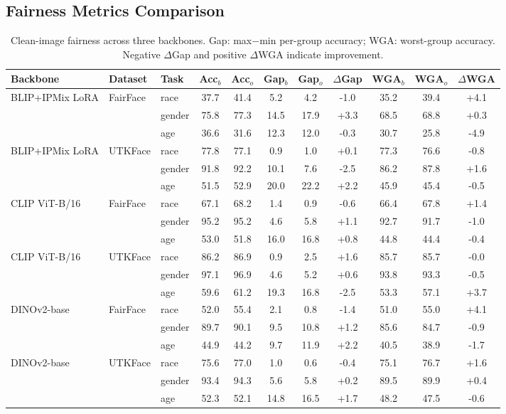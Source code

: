 \subsection{Fairness Metrics Comparison}
\label{app:fairness}

\begin{table}[tbp]
\caption{Clean-image fairness across three backbones. Gap: max$-$min per-group accuracy; WGA: worst-group accuracy. Negative $\Delta$Gap and positive $\Delta$WGA indicate improvement.}
\label{tab:app_fairness}
\centering\small
\begin{tabular}{ll l cc cc c cc c}
\toprule
Backbone & Dataset & Task & Acc$_b$ & Acc$_o$ & Gap$_b$ & Gap$_o$ & $\Delta$Gap & WGA$_b$ & WGA$_o$ & $\Delta$WGA \\
\midrule
BLIP+IPMix LoRA & FairFace & race & 37.7 & 41.4 & 5.2 & 4.2 & -1.0 & 35.2 & 39.4 & +4.1 \\
 &  & gender & 75.8 & 77.3 & 14.5 & 17.9 & +3.3 & 68.5 & 68.8 & +0.3 \\
 &  & age & 36.6 & 31.6 & 12.3 & 12.0 & -0.3 & 30.7 & 25.8 & -4.9 \\
\midrule
BLIP+IPMix LoRA & UTKFace & race & 77.8 & 77.1 & 0.9 & 1.0 & +0.1 & 77.3 & 76.6 & -0.8 \\
 &  & gender & 91.8 & 92.2 & 10.1 & 7.6 & -2.5 & 86.2 & 87.8 & +1.6 \\
 &  & age & 51.5 & 52.9 & 20.0 & 22.2 & +2.2 & 45.9 & 45.4 & -0.5 \\
\midrule
CLIP ViT-B/16 & FairFace & race & 67.1 & 68.2 & 1.4 & 0.9 & -0.6 & 66.4 & 67.8 & +1.4 \\
 &  & gender & 95.2 & 95.2 & 4.6 & 5.8 & +1.1 & 92.7 & 91.7 & -1.0 \\
 &  & age & 53.0 & 51.8 & 16.0 & 16.8 & +0.8 & 44.8 & 44.4 & -0.4 \\
\midrule
CLIP ViT-B/16 & UTKFace & race & 86.2 & 86.9 & 0.9 & 2.5 & +1.6 & 85.7 & 85.7 & -0.0 \\
 &  & gender & 97.1 & 96.9 & 4.6 & 5.2 & +0.6 & 93.8 & 93.3 & -0.5 \\
 &  & age & 59.6 & 61.2 & 19.3 & 16.8 & -2.5 & 53.3 & 57.1 & +3.7 \\
\midrule
DINOv2-base & FairFace & race & 52.0 & 55.4 & 2.1 & 0.8 & -1.4 & 51.0 & 55.0 & +4.1 \\
 &  & gender & 89.7 & 90.1 & 9.5 & 10.8 & +1.2 & 85.6 & 84.7 & -0.9 \\
 &  & age & 44.9 & 44.2 & 9.7 & 11.9 & +2.2 & 40.5 & 38.9 & -1.7 \\
\midrule
DINOv2-base & UTKFace & race & 75.6 & 77.0 & 1.0 & 0.6 & -0.4 & 75.1 & 76.7 & +1.6 \\
 &  & gender & 93.4 & 94.3 & 5.6 & 5.8 & +0.2 & 89.5 & 89.9 & +0.4 \\
 &  & age & 52.3 & 52.1 & 14.8 & 16.5 & +1.7 & 48.2 & 47.5 & -0.6 \\
\bottomrule
\end{tabular}
\end{table}

